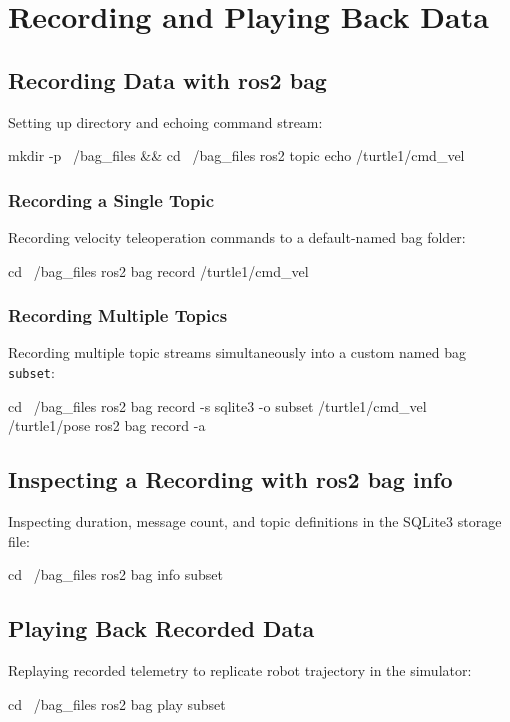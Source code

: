 \documentclass[11pt,a4paper]{article}
\begin{document}
\section{Recording and Playing Back Data}

\subsection{Recording Data with ros2 bag}
Setting up directory and echoing command stream:
\begin{cmdbox}
mkdir -p ~/bag_files && cd ~/bag_files
ros2 topic echo /turtle1/cmd_vel
\end{cmdbox}

\subsubsection{Recording a Single Topic}
Recording velocity teleoperation commands to a default-named bag folder:
\begin{cmdbox}
cd ~/bag_files
ros2 bag record /turtle1/cmd_vel
\end{cmdbox}

\subsubsection{Recording Multiple Topics}
Recording multiple topic streams simultaneously into a custom named bag \texttt{subset}:
\begin{cmdbox}
cd ~/bag_files
ros2 bag record -s sqlite3 -o subset /turtle1/cmd_vel /turtle1/pose
ros2 bag record -a
\end{cmdbox}

\subsection{Inspecting a Recording with ros2 bag info}
Inspecting duration, message count, and topic definitions in the SQLite3 storage file:
\begin{cmdbox}
cd ~/bag_files
ros2 bag info subset
\end{cmdbox}

\subsection{Playing Back Recorded Data}
Replaying recorded telemetry to replicate robot trajectory in the simulator:
\begin{cmdbox}
cd ~/bag_files
ros2 bag play subset
\end{cmdbox}
\end{document}
